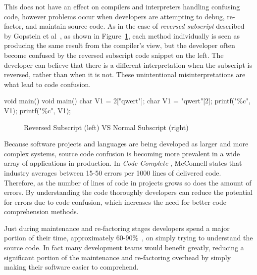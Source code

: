 This does not have an effect on compilers and
interpreters handling confusing code, however problems occur when 
developers are attempting to debug, re-factor, and maintain source 
code. As in the case of \textit{reversed subscript} described by 
Gopstein et al~\cite{gopstein_prevalence_2018}, as shown in Figure~\ref{fig:reversed},
each method individually is seen as producing the same result
from the compiler's view, but the developer often become confused by 
the reversed subscript code snippet on the left. The 
developer can believe that there is a different interpretation when 
the subscript is reversed, rather than when it is not.
These unintentional misinterpretations are what lead 
to code confusion.

\begin{verbbox}[\scriptsize]
void main() {            void main() {
char V1 = 2["qwert"];    char V1 = "qwert"[2];
printf("\%c\n", V1);     printf("\%c\n", V1);
}                        }
\end{verbbox}

\begin{figure}[ht]
\begin{tcolorbox}
\centering
\theverbbox\qquad
\end{tcolorbox}
\caption{Reversed Subscript (left) VS Normal Subscript (right) }
\label{fig:reversed}
\end{figure}



 

Because software projects and languages are being developed as larger and more complex systems, source code confusion is becoming more
prevalent in a wide array of applications in production. In 
\textit{Code Complete} \cite{mcconnell_code_2004}, McConnell states that industry
averages between 15-50 errors per 1000 lines of delivered code. Therefore, as the number of lines
of code in projects grows so does the amount of errors. By understanding the code thoroughly developers can reduce the potential for errors due to code confusion, which increases the need for better code comprehension methods.

Just during maintenance and re-factoring stages developers spend a major 
portion of their time, approximately 60-90\%~\cite{ward_program_nodate}, on simply trying to understand the
source code. In fact many development teams would
benefit greatly, reducing a significant portion of the 
maintenance and re-factoring overhead by simply making their 
software easier to comprehend.

